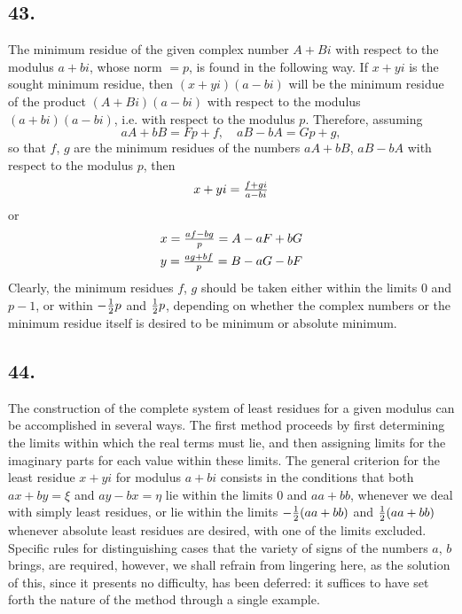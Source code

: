 \documentclass[twoside,12pt, showframe]{memoir}
\let\oldfrac\frac
\def\frac#1#2{\mathchoice{\tfrac{#1}{#2}}{\oldfrac{#1}{#2}}{\genfrac{}{}{}{2}{#1}{#2\mathstrut}}{\genfrac{}{}{}{3}{#1}{#2\mathstrut}}}
\begin{document}
\subsection*{43.}

The minimum residue of the given complex number \(A+Bi\) with respect to the modulus \(a+bi\), whose norm \(=p\), is found in the following way. If \(x+yi\) is the sought minimum residue, then \((x+yi)(a-bi)\) will be the minimum residue of the product \((A+Bi)(a-bi)\) with respect to the modulus \((a+bi)(a-bi)\), i.e. with respect to the modulus \(p\). Therefore, assuming
\[a A+ b B = F p + f, \quad a B - b A = G p + g,\]
so that \(f\), \(g\) are the minimum residues of the numbers \(aA + bB\), \(aB - bA\) with respect to the modulus \(p\), then
\[x+yi=\frac{f+gi}{a-bi}\]
or
\[\begin{aligned}
& x=\frac{af-bg}{p}=A-aF+bG \\
& y=\frac{ag+bf}{p}=B-aG-bF
\end{aligned}\]
Clearly, the minimum residues \(f\), \(g\) should be taken either within the limits 0 and \(p-1\), or within \(-\frac{1}{2}p\) and \(\frac{1}{2}p\), depending on whether the complex numbers or the minimum residue itself is desired to be minimum or absolute minimum.
%

\subsection*{44.}

The construction of the complete system of least residues for a given modulus can be accomplished in several ways. The first method proceeds by first determining the limits within which the real terms must lie, and then assigning limits for the imaginary parts for each value within these limits. The general criterion for the least residue \(x+yi\) for modulus \(a+bi\) consists in the conditions that both \(ax+by=\xi\) and \(ay-bx=\eta\) lie within the limits \(0\) and \(aa+bb\), whenever we deal with simply least residues, or lie within the limits \(-\frac{1}{2}(aa+bb)\) and \(\frac{1}{2}(aa+bb)\) whenever absolute least residues are desired, with one of the limits excluded. Specific rules for distinguishing cases that the variety of signs of the numbers \(a\), \(b\) brings, are required, however, we shall refrain from lingering here, as the solution of this, since it presents no difficulty, has been deferred: it suffices to have set forth the nature of the method through a single example.
%
\end{document}
